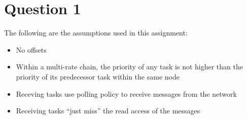 \section{Question 1}

    The following are the assumptions used in this assignment:

    \begin{itemize}
        \item No offsets
        \item Within a multi-rate chain, the priority of any task is not higher than the priority of its
        predecessor task within the same node
        \item Receving tasks use polling policy to receive messages from the network
        \item Receiving tasks “just miss” the read access of the messages
    \end{itemize}
